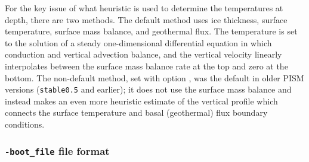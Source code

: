 For the key issue of what heuristic is used to determine the temperatures at depth, there are two methods.  The default method uses ice thickness, surface temperature, surface mass balance, and geothermal flux.  The temperature is set to the solution of a steady one-dimensional differential equation in which conduction and vertical advection balance, and the vertical velocity linearly interpolates between the surface mass balance rate at the top and zero at the bottom.  The non-default method, set with option , was the default in older PISM versions (\texttt{stable0.5} and earlier); it does not use the surface mass balance and instead makes an even more heuristic estimate of the vertical profile which connects the surface temperature and basal (geothermal) flux boundary conditions.

\subsubsection*{\texttt{-boot_file} file format}
\label{sec:bootstrapping-format}

